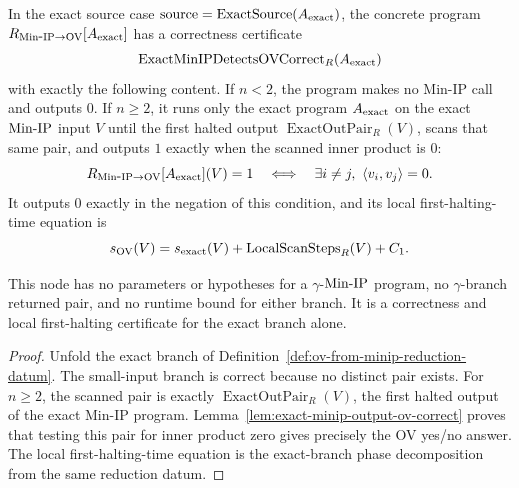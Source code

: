 \begin{lemma}
  \label{lem:exact-minip-detects-ov-correctness-certificate}
  In the exact source case
  $\operatorname{source}=\operatorname{ExactSource}(A_{\rm exact})$, the
  concrete program $R_{\mathrm{Min\mbox{-}IP}\to\mathrm{OV}}[A_{\rm exact}]$ has a correctness
  certificate
  \[
    \operatorname{ExactMinIPDetectsOVCorrect}_R(A_{\rm exact})
  \]
  with exactly the following content.  If $n<2$, the program makes no Min-IP
  call and outputs $0$.  If $n\geq2$, it runs only the exact program
  $A_{\rm exact}$ on the exact $\mathrm{Min\mbox{-}IP}$ input $V$ until the first halted output
  $\operatorname{ExactOutPair}_R(V)$, scans that same pair, and outputs $1$
  exactly when the scanned inner product is $0$:
  \[
    R_{\mathrm{Min\mbox{-}IP}\to\mathrm{OV}}[A_{\rm exact}](V)=1
      \quad\Longleftrightarrow\quad
    \exists i\neq j,\ \left\langle v_i,v_j\right\rangle=0.
  \]
  It outputs $0$ exactly in the negation of this condition, and its local
  first-halting-time equation is
  \[
    s_{\mathrm{OV}}(V)=s_{\rm exact}(V)
      +\operatorname{LocalScanSteps}_R(V)+C_1.
  \]

  This node has no parameters or hypotheses for a $\gamma$-$\mathrm{Min\mbox{-}IP}$ program,
  no $\gamma$-branch returned pair, and no runtime bound for either branch.
  It is a correctness and local first-halting certificate for the exact branch
  alone.
\end{lemma}
\begin{proof}
  Unfold the exact branch of
  Definition~\ref{def:ov-from-minip-reduction-datum}.  The small-input branch
  is correct because no distinct pair exists.  For $n\geq2$, the scanned pair
  is exactly $\operatorname{ExactOutPair}_R(V)$, the first halted output of the
  exact Min-IP program.  Lemma~\ref{lem:exact-minip-output-ov-correct} proves
  that testing this pair for inner product zero gives precisely the OV yes/no
  answer.  The local first-halting-time equation is the exact-branch phase
  decomposition from the same reduction datum.
\end{proof}

